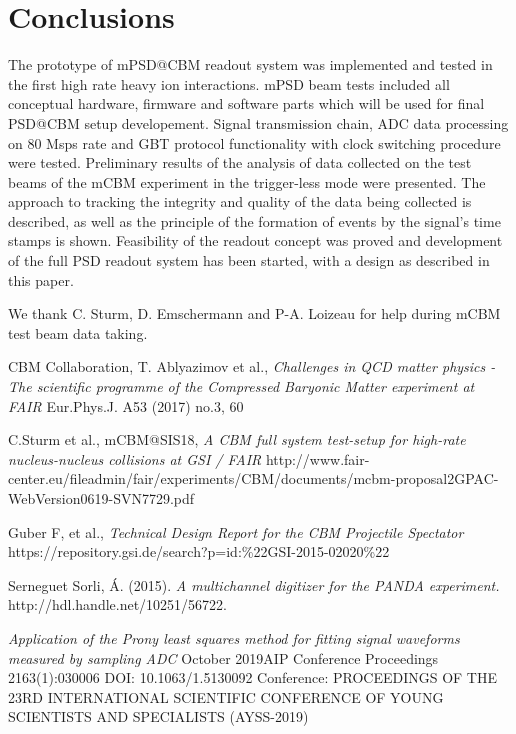 \documentclass[a4paper,11pt]{article}
\begin{document}
\section{Conclusions}
The prototype of mPSD@CBM readout system was implemented and tested in the first high rate heavy ion interactions. mPSD beam tests included all conceptual hardware, firmware and software parts which will be used for final PSD@CBM setup developement. Signal transmission chain, ADC data processing on 80 Msps rate and GBT protocol functionality with clock switching procedure were tested. Preliminary results of the analysis of data collected on the test beams of the mCBM experiment in the trigger-less mode were presented. The approach to tracking the integrity and quality of the data being collected is described, as well as the principle of the formation of events by the signal's time stamps is shown.
Feasibility of the readout concept was proved and development of the full PSD readout system has been started, with a design as described in this paper.

\acknowledgments
We thank C. Sturm, D. Emschermann and P-A. Loizeau for help during mCBM test beam data taking.

\begin{thebibliography}{99}


CBM Collaboration, T. Ablyazimov et al., \emph{Challenges in QCD matter physics -The scientific programme of the Compressed Baryonic Matter experiment at FAIR} Eur.Phys.J. A53 (2017) no.3, 60 


C.Sturm et al., mCBM@SIS18, \emph{A CBM full system test-setup for high-rate nucleus-nucleus collisions at GSI / FAIR} http://www.fair-center.eu/fileadmin/fair/experiments/CBM/documents/mcbm-proposal2GPAC-WebVersion0619-SVN7729.pdf

Guber F, et al., \emph{Technical Design Report for the CBM Projectile Spectator} https://repository.gsi.de/search?p=id:\%22GSI-2015-02020\%22

Serneguet Sorli, Á. (2015). \emph{A multichannel digitizer for the PANDA experiment.} http://hdl.handle.net/10251/56722.

\emph{Application of the Prony least squares method for fitting signal waveforms measured by sampling ADC}
October 2019AIP Conference Proceedings 2163(1):030006
DOI: 10.1063/1.5130092
Conference: PROCEEDINGS OF THE 23RD INTERNATIONAL SCIENTIFIC CONFERENCE OF YOUNG SCIENTISTS AND SPECIALISTS (AYSS-2019)



\end{thebibliography}
\end{document}
